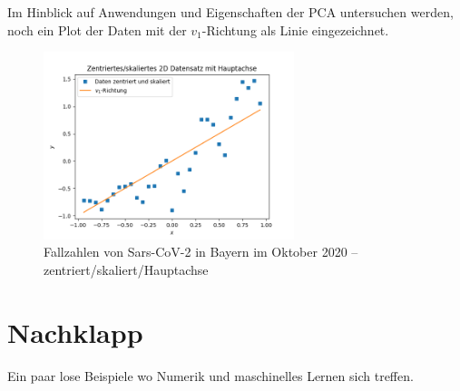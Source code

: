 \documentclass[
]{book}
\theoremstyle{definition}
\theoremstyle{definition}
\theoremstyle{definition}
\theoremstyle{definition}
\theoremstyle{remark}
\begin{document}
Im Hinblick auf Anwendungen und Eigenschaften der PCA untersuchen werden, noch ein Plot der Daten mit der \(v_1\)-Richtung als Linie eingezeichnet.

\begin{figure}
\hypertarget{fig:cases-cntrd-HA}{%
\centering
\includegraphics[width=0.65\textwidth,height=\textheight]{bilder/07-covid-cntrd-HA.png}
\caption{Fallzahlen von Sars-CoV-2 in Bayern im Oktober
2020 -- zentriert/skaliert/Hauptachse}\label{fig:cases-cntrd-HA}
}
\end{figure}

\hypertarget{nachklapp}{%
\chapter{Nachklapp}\label{nachklapp}}

Ein paar lose Beispiele wo Numerik und maschinelles Lernen sich treffen.
\end{document}
